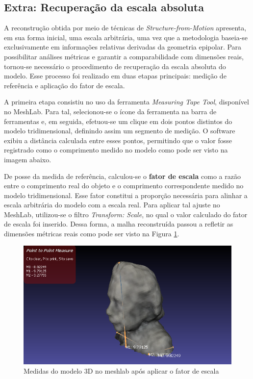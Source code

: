 \documentclass[12pt]{article}
\begin{document}
\subsection{Extra: Recuperação da escala absoluta }

A reconstrução obtida por meio de técnicas de \textit{Structure-from-Motion} apresenta, em sua forma inicial, uma escala arbitrária, uma vez que a metodologia baseia-se exclusivamente em informações relativas derivadas da geometria epipolar. Para possibilitar análises métricas e garantir a comparabilidade com dimensões reais, tornou-se necessário o procedimento de recuperação da escala absoluta do modelo. Esse processo foi realizado em duas etapas principais: medição de referência e aplicação do fator de escala.

A primeira etapa consistiu no uso da ferramenta \textit{Measuring Tape Tool}, disponível no MeshLab. Para tal, selecionou-se o ícone da ferramenta na barra de ferramentas e, em seguida, efetuou-se um clique em dois pontos distintos do modelo tridimensional, definindo assim um segmento de medição. O software exibiu a distância calculada entre esses pontos, permitindo que o valor fosse registrado como o comprimento medido no modelo como pode ser visto na imagem abaixo.

De posse da medida de referência, calculou-se o \textbf{fator de escala} como a razão entre o comprimento real do objeto e o comprimento correspondente medido no modelo tridimensional. Esse fator constitui a proporção necessária para alinhar a escala arbitrária do modelo com a escala real. Para aplicar tal ajuste no MeshLab, utilizou-se o filtro \textit{ Transform: Scale}, no qual o valor calculado do fator de escala foi inserido. Dessa forma, a malha reconstruída passou a refletir as dimensões métricas reais como pode ser visto na Figura \ref{fig:model_scale}.

\begin{figure}[H]
    \centering
    \includegraphics[width=.5\textwidth]{images/measures_model3D_scale.png}
    \caption{Medidas do modelo 3D no meshlab após aplicar o fator de escala}
    \label{fig:model_scale}
\end{figure}
\end{document}
